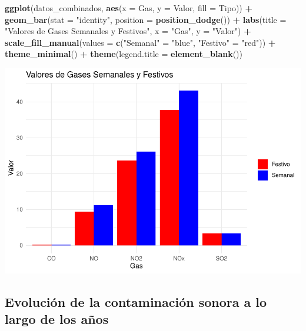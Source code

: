 \documentclass[notspecified,article,submit,moreauthors,pdftex]{Definitions/mdpi}
\newenvironment{Shaded}{\begin{snugshade}}{\end{snugshade}}
\newcommand{\AttributeTok}[1]{\textcolor[rgb]{0.13,0.29,0.53}{#1}}
\newcommand{\FunctionTok}[1]{\textcolor[rgb]{0.13,0.29,0.53}{\textbf{#1}}}
\newcommand{\NormalTok}[1]{#1}
\newcommand{\OtherTok}[1]{\textcolor[rgb]{0.56,0.35,0.01}{#1}}
\newcommand{\SpecialCharTok}[1]{\textcolor[rgb]{0.81,0.36,0.00}{\textbf{#1}}}
\newcommand{\StringTok}[1]{\textcolor[rgb]{0.31,0.60,0.02}{#1}}
\begin{document}
\begin{Shaded}
\begin{Highlighting}[]
\FunctionTok{ggplot}\NormalTok{(datos\_combinados, }\FunctionTok{aes}\NormalTok{(}\AttributeTok{x =}\NormalTok{ Gas, }\AttributeTok{y =}\NormalTok{ Valor, }\AttributeTok{fill =}\NormalTok{ Tipo)) }\SpecialCharTok{+}
  \FunctionTok{geom\_bar}\NormalTok{(}\AttributeTok{stat =} \StringTok{"identity"}\NormalTok{, }\AttributeTok{position =} \FunctionTok{position\_dodge}\NormalTok{()) }\SpecialCharTok{+}
  \FunctionTok{labs}\NormalTok{(}\AttributeTok{title =} \StringTok{"Valores de Gases Semanales y Festivos"}\NormalTok{,}
       \AttributeTok{x =} \StringTok{"Gas"}\NormalTok{,}
       \AttributeTok{y =} \StringTok{"Valor"}\NormalTok{) }\SpecialCharTok{+}
  \FunctionTok{scale\_fill\_manual}\NormalTok{(}\AttributeTok{values =} \FunctionTok{c}\NormalTok{(}\StringTok{"Semanal"} \OtherTok{=} \StringTok{"blue"}\NormalTok{, }\StringTok{"Festivo"} \OtherTok{=} \StringTok{"red"}\NormalTok{)) }\SpecialCharTok{+}
  \FunctionTok{theme\_minimal}\NormalTok{() }\SpecialCharTok{+}
  \FunctionTok{theme}\NormalTok{(}\AttributeTok{legend.title =} \FunctionTok{element\_blank}\NormalTok{())}
\end{Highlighting}
\end{Shaded}

\includegraphics{ProyectoAED2023_plantilla_files/figure-latex/unnamed-chunk-28-1.pdf}

\hypertarget{evoluciuxf3n-de-la-contaminaciuxf3n-sonora-a-lo-largo-de-los-auxf1os}{%
\subsection{Evolución de la contaminación sonora a lo largo de los
años}\label{evoluciuxf3n-de-la-contaminaciuxf3n-sonora-a-lo-largo-de-los-auxf1os}}
\end{document}
